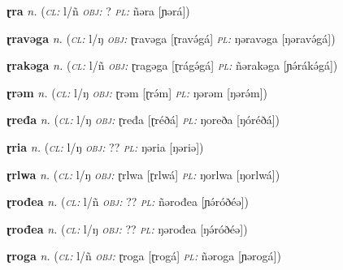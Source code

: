 \newentry
\headword\textbf{ɽra}  
\ipa{[ɽrá]}
\synpos\textit{n.} 
\class(\textit{\textsc{cl:}} {l/ñ}
\object\textit{\textsc{obj:}} ?
\plural\textit{\textsc{pl:}} ñəra [ɲərá])

\newentry
\headword\textbf{ɽravəga}  
\ipa{[ɽravə́gá]}
\synpos\textit{n.} 
\class(\textit{\textsc{cl:}} {l/ŋ}
\object\textit{\textsc{obj:}} ɽravəga [ɽravə́gá]
\plural\textit{\textsc{pl:}} ŋəravəga [ŋəravə́gá]) 

\newentry
\headword\textbf{ɽrakəga}  
\ipa{[ɽrákə́gá]}
\synpos\textit{n.} 
\class(\textit{\textsc{cl:}} {l/ñ}
\object\textit{\textsc{obj:}} ɽragəga [ɽrágə́gá]
\plural\textit{\textsc{pl:}} ñərakəga [ɲə́rákə́gá]) 

\newentry
\headword\textbf{ɽrəm}  
\ipa{[ɽrə́m]}
\synpos\textit{n.} 
\class(\textit{\textsc{cl:}} {l/ŋ}
\object\textit{\textsc{obj:}} ɽrəm [ɽrə́m]
\plural\textit{\textsc{pl:}} ŋərəm [ŋərə́m]) 

\newentry
\headword\textbf{ɽređa}  
\ipa{[ɽréðá]}
\synpos\textit{n.} 
\class(\textit{\textsc{cl:}} {l/ŋ}
\object\textit{\textsc{obj:}} ɽređa [ɽréðá]
\plural\textit{\textsc{pl:}} ŋoreða [ŋóréðá]) 

\newentry
\headword\textbf{ɽria}  
\ipa{[ɽriə]}
\synpos\textit{n.} 
\class(\textit{\textsc{cl:}} {l/ŋ}
\object\textit{\textsc{obj:}} ??
\plural\textit{\textsc{pl:}} ŋəria [ŋəriə]) 

\newentry
\headword\textbf{ɽrlwa}  
\ipa{[ɽrlwá]}
\synpos\textit{n.} 
\class(\textit{\textsc{cl:}} {l/ŋ}
\object\textit{\textsc{obj:}} ɽrlwa [ɽrlwá]
\plural\textit{\textsc{pl:}} ŋorlwa [ŋorlwá])

\newentry
\headword\textbf{ɽrođea}  
\ipa{[ɽŕóðéə]}
\synpos\textit{n.} 
\class(\textit{\textsc{cl:}} {l/ñ}
\object\textit{\textsc{obj:}} ??
\plural\textit{\textsc{pl:}} ñərođea [ɲə́róðéə]) 

\newentry
\headword\textbf{ɽrođea}  
\ipa{[ɽŕóðéə]}
\synpos\textit{n.} 
\class(\textit{\textsc{cl:}} {l/ŋ}
\object\textit{\textsc{obj:}} ??
\plural\textit{\textsc{pl:}} ŋərođea [ŋə́róðéə]) 
	
\newentry
\headword\textbf{ɽroga}  
\ipa{[ɽrogá]}
\synpos\textit{n.} 
\class(\textit{\textsc{cl:}} {l/ñ}
\object\textit{\textsc{obj:}} ɽroga [ɽrogá]
\plural\textit{\textsc{pl:}} ñəroga [ɲərogá]) 

